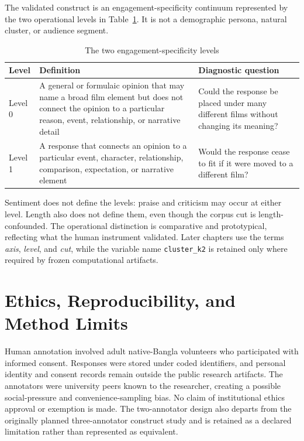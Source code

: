 The validated construct is an engagement-specificity continuum represented by the two operational levels in Table~\ref{tab:engagement-levels}. It is not a demographic persona, natural cluster, or audience segment.

\begin{table}[H]
\centering
\caption{The two engagement-specificity levels}
\label{tab:engagement-levels}
\footnotesize
\setlength{\tabcolsep}{4pt}
\renewcommand{\arraystretch}{1.12}
\begin{tabularx}{\textwidth}{@{}>{\raggedright\arraybackslash}p{} >{\raggedright\arraybackslash}p{} >{\raggedright\arraybackslash}X@{}}
\toprule
\textbf{Level} & \textbf{Definition} & \textbf{Diagnostic question} \\
\midrule
Level 0 & A general or formulaic opinion that may name a broad film element but does not connect the opinion to a particular reason, event, relationship, or narrative detail & Could the response be placed under many different films without changing its meaning? \\
Level 1 & A response that connects an opinion to a particular event, character, relationship, comparison, expectation, or narrative element & Would the response cease to fit if it were moved to a different film? \\
\bottomrule
\end{tabularx}
\end{table}

Sentiment does not define the levels: praise and criticism may occur at either level. Length also does not define them, even though the corpus cut is length-confounded. The operational distinction is comparative and prototypical, reflecting what the human instrument validated. Later chapters use the terms \textit{axis}, \textit{level}, and \textit{cut}, while the variable name \texttt{cluster\_k2} is retained only where required by frozen computational artifacts.

\section{Ethics, Reproducibility, and Method Limits}
\label{sec:ch3-ethics-reproducibility-limitations}

Human annotation involved adult native-Bangla volunteers who participated with informed consent. Responses were stored under coded identifiers, and personal identity and consent records remain outside the public research artifacts. The annotators were university peers known to the researcher, creating a possible social-pressure and convenience-sampling bias. No claim of institutional ethics approval or exemption is made. The two-annotator design also departs from the originally planned three-annotator construct study and is retained as a declared limitation rather than represented as equivalent.

